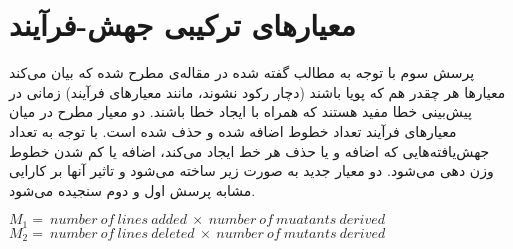 \section{معیارهای ترکیبی جهش-فرآیند}
پرسش سوم با توجه به مطالب گفته شده در مقاله‌ی \cite{rahman2013and} مطرح شده که بیان می‌کند معیارها هر چقدر هم که پویا باشند (دچار رکود نشوند، مانند معیارهای فرآیند) زمانی در پیش‌بینی خطا مفید هستند که همراه با ایجاد خطا باشند.  دو معیار مطرح در میان معیارهای فرآیند تعداد خطوط اضافه شده و حذف شده است. با توجه به تعداد جهش‌یافته‌هایی که  اضافه  و یا حذف هر خط ایجاد می‌کند، اضافه یا کم شدن خطوط وزن دهی می‌شود. دو معیار جدید به صورت زیر ساخته می‌شود و تاثیر آنها بر کارایی مشابه پرسش اول و دوم سنجیده می‌شود. \\
\begin{latin}
	
	$M_1 =\ number\ of\ lines\ added\ \times \ number\ of\ muatants\ derived$\\
	
	$M_2 =\ number\ of\ lines\ deleted\ \times \ number\ of\ mutants\ derived$\\
\end{latin}

